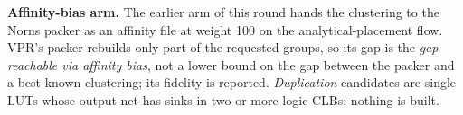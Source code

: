 \textbf{Affinity-bias arm.} The earlier arm of this round hands the clustering to the Norns packer as an affinity file at weight 100 on the analytical-placement flow. VPR's packer
rebuilds only part of the requested groups, so its gap is the \emph{gap reachable via affinity bias}, not a lower bound on the gap between the packer and a best-known clustering; its fidelity is reported.
\emph{Duplication} candidates are single LUTs whose output net has sinks in two or more logic CLBs; nothing is built.
